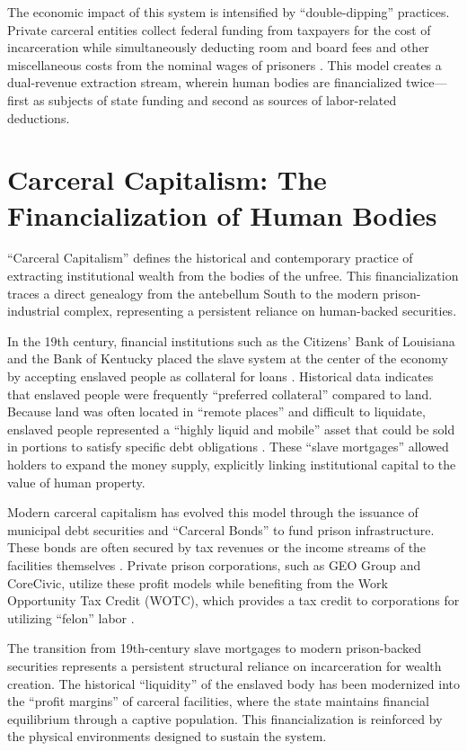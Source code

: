 \documentclass[12pt,openany]{book}
\begin{document}
The economic impact of this system is intensified by ``double-dipping'' practices. Private carceral entities collect federal funding from taxpayers for the cost of incarceration while simultaneously deducting room and board fees and other miscellaneous costs from the nominal wages of prisoners \cite{princeton_legal}. This model creates a dual-revenue extraction stream, wherein human bodies are financialized twice---first as subjects of state funding and second as sources of labor-related deductions.

\section{Carceral Capitalism: The Financialization of Human Bodies}

``Carceral Capitalism'' defines the historical and contemporary practice of extracting institutional wealth from the bodies of the unfree. This financialization traces a direct genealogy from the antebellum South to the modern prison-industrial complex, representing a persistent reliance on human-backed securities.

In the 19th century, financial institutions such as the Citizens' Bank of Louisiana and the Bank of Kentucky placed the slave system at the center of the economy by accepting enslaved people as collateral for loans \cite{murphy}. Historical data indicates that enslaved people were frequently ``preferred collateral'' compared to land. Because land was often located in ``remote places'' and difficult to liquidate, enslaved people represented a ``highly liquid and mobile'' asset that could be sold in portions to satisfy specific debt obligations \cite{murphy}. These ``slave mortgages'' allowed holders to expand the money supply, explicitly linking institutional capital to the value of human property.

Modern carceral capitalism has evolved this model through the issuance of municipal debt securities and ``Carceral Bonds'' to fund prison infrastructure. These bonds are often secured by tax revenues or the income streams of the facilities themselves \cite{insight_investment}. Private prison corporations, such as GEO Group and CoreCivic, utilize these profit models while benefiting from the Work Opportunity Tax Credit (WOTC), which provides a tax credit to corporations for utilizing ``felon'' labor \cite{princeton_legal}.

The transition from 19th-century slave mortgages to modern prison-backed securities represents a persistent structural reliance on incarceration for wealth creation. The historical ``liquidity'' of the enslaved body has been modernized into the ``profit margins'' of carceral facilities, where the state maintains financial equilibrium through a captive population. This financialization is reinforced by the physical environments designed to sustain the system.
\end{document}
